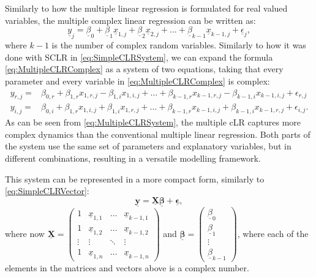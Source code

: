 \documentclass[
]{book}
\begin{document}
Similarly to how the multiple linear regression is formulated for real valued variables, the multiple complex linear regression can be written as:
\begin{equation}
    \underline{y}_j = \underline{\beta}_0 + \underline{\beta}_1 \underline{x}_{1,j} + \underline{\beta}_2 \underline{x}_{2,j} + \dots + \underline{\beta}_{k-1} \underline{x}_{k-1,j} + \underline{\epsilon}_j,
    \label{eq:MultipleCLRComplex}
\end{equation}
where \(k-1\) is the number of complex random variables. Similarly to how it was done with SCLR in \eqref{eq:SimpleCLRSystem}, we can expand the formula \eqref{eq:MultipleCLRComplex} as a system of two equations, taking that every parameter and every variable in \eqref{eq:MultipleCLRComplex} is complex:
\begin{equation}
    \begin{aligned}
        y_{r,j} = & \beta_{0,r} + \beta_{1,r} x_{1,r,j} - \beta_{1,i} x_{1,i,j} + \dots + \beta_{k-1,r} x_{k-1,r,j} - \beta_{k-1,i} x_{k-1,i,j} + \epsilon_{r,j} \\
        y_{i,j} = & \beta_{0,i} + \beta_{1,r} x_{1,i,j} + \beta_{1,i} x_{1,r,j} + \dots + \beta_{k-1,r} x_{k-1,i,j} + \beta_{k-1,i} x_{k-1,r,j} + \epsilon_{i,j} .
    \end{aligned}
    \label{eq:MultipleCLRSystem}
\end{equation}
As can be seen from \eqref{eq:MultipleCLRSystem}, the multiple cLR captures more complex dynamics than the conventional multiple linear regression. Both parts of the system use the same set of parameters and explanatory variables, but in different combinations, resulting in a versatile modelling framework.

This system can be represented in a more compact form, similarly to \eqref{eq:SimpleCLRVector}:
\begin{equation}
    \underline{\mathbf{y}} = \underline{\mathbf{X}} \underline{\boldsymbol{\beta}} + \underline{\boldsymbol{\epsilon}} ,
    \label{eq:CLRVector}
\end{equation}
where now \(\underline{\mathbf{X}} = \begin{pmatrix} 1 & \underline{x}_{1,1} & \dots & \underline{x}_{k-1,1} \\ 1 & \underline{x}_{1,2} & \dots & \underline{x}_{k-1,2} \\ \vdots & \vdots & \ddots & \vdots \\ 1 & \underline{x}_{1,n} & \dots & \underline{x}_{k-1,n} \end{pmatrix}\) and \(\underline{\boldsymbol{\beta}} = \begin{pmatrix} \underline{\beta}_0 \\ \underline{\beta}_1 \\ \vdots \\ \underline{\beta}_{k-1} \end{pmatrix}\), where each of the elements in the matrices and vectors above is a complex number.
\end{document}
